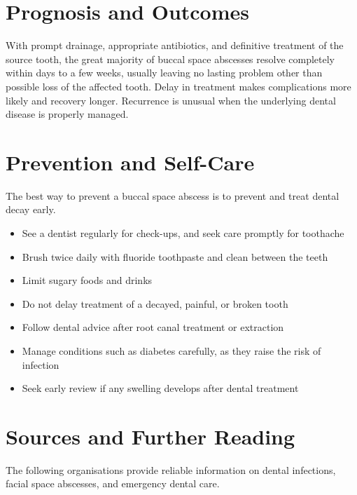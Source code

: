 \section*{Prognosis and Outcomes}
With prompt drainage, appropriate antibiotics, and definitive treatment of the source tooth, the great majority of buccal space abscesses resolve completely within days to a few weeks, usually leaving no lasting problem other than possible loss of the affected tooth. Delay in treatment makes complications more likely and recovery longer. Recurrence is unusual when the underlying dental disease is properly managed.

\section*{Prevention and Self-Care}
The best way to prevent a buccal space abscess is to prevent and treat dental decay early.

\begin{itemize}
    \item See a dentist regularly for check-ups, and seek care promptly for toothache
    \item Brush twice daily with fluoride toothpaste and clean between the teeth
    \item Limit sugary foods and drinks
    \item Do not delay treatment of a decayed, painful, or broken tooth
    \item Follow dental advice after root canal treatment or extraction
    \item Manage conditions such as diabetes carefully, as they raise the risk of infection
    \item Seek early review if any swelling develops after dental treatment
\end{itemize}

\section*{Sources and Further Reading}
The following organisations provide reliable information on dental infections, facial space abscesses, and emergency dental care.

